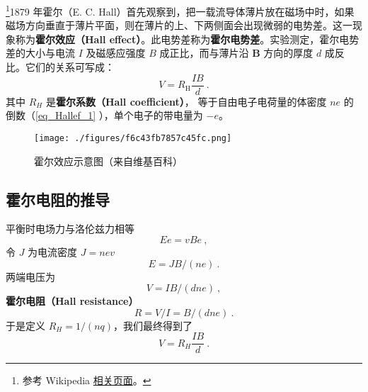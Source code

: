 
\begin{issues}
\issueDraft
\end{issues}

\footnote{参考 Wikipedia \href{https://en.wikipedia.org/wiki/Hall_effect}{相关页面}。}1879 年霍尔（E. C. Hall）首先观察到，把一载流导体薄片放在磁场中时，如果磁场方向垂直于薄片平面，则在薄片的上、下两侧面会出现微弱的电势差。这一现象称为\textbf{霍尔效应（Hall effect）}。此电势差称为\textbf{霍尔电势差}。实验测定，霍尔电势差的大小与电流 $I$ 及磁感应强度 $B$ 成正比，而与薄片沿 $\mathbf B$ 方向的厚度 $d$ 成反比。它们的关系可写成：
\begin{equation}
V = R_{\mathrm{H}} \frac{I B}{d}~.
\end{equation}
其中 $R_H$ 是\textbf{霍尔系数（Hall coefficient）}， 等于自由电子电荷量的体密度 $ne$ 的倒数（\autoref{eq_Hallef_1} ），单个电子的带电量为 $-e$。

\begin{figure}[ht]
\centering
\texttt{[image: ./figures/f6c43fb7857c45fc.png]}
\caption{霍尔效应示意图（来自维基百科）} \label{fig_Hallef_1}
\end{figure}

\subsection{霍尔电阻的推导}
平衡时电场力与洛伦兹力相等
\begin{equation}
Ee = vBe~,
\end{equation}
令 $J$ 为电流密度 $J=nev$
\begin{equation}
E = JB/(ne)~.
\end{equation}
两端电压为
\begin{equation}\label{eq_Hallef_1}
V = IB/(d n e)~,
\end{equation}
\textbf{霍尔电阻（Hall resistance）}
\begin{equation}\label{eq_Hallef_2}
R = V/I = B/(d n e)~.
\end{equation}
于是定义 $R_H=1/(nq)$，我们最终得到了
\begin{equation}
V=R_H\frac{IB}{d}~.
\end{equation}

